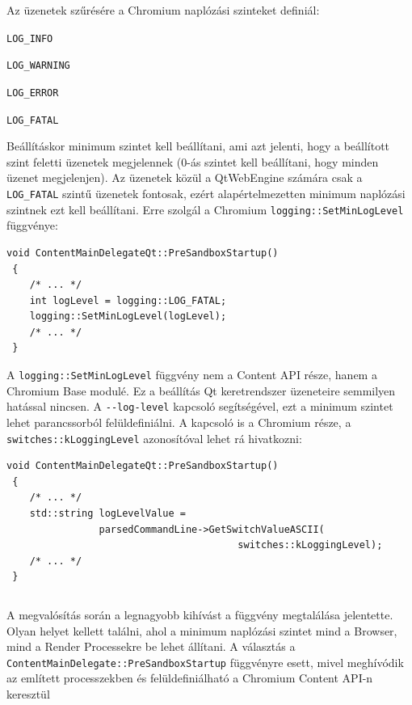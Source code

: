 \documentclass[12pt]{report}
\begin{document}
Az üzenetek szűrésére a Chromium naplózási szinteket definiál:
\begin{description}[
            labelsep=-0.5cm,
            itemsep=0cm,
            before={\renewcommand\makelabel[1]{\bfseries ##1}}]
    \item[0] \texttt{LOG\_INFO}
    \item[1] \texttt{LOG\_WARNING}
    \item[2] \texttt{LOG\_ERROR}
    \item[3] \texttt{LOG\_FATAL}
\end{description}
Beállításkor minimum szintet kell beállítani, ami azt jelenti, hogy a beállított szint
feletti üzenetek megjelennek (0-ás szintet kell beállítani, hogy minden üzenet megjelenjen).
Az üzenetek közül a QtWebEngine számára csak a \texttt{LOG\_FATAL} szintű üzenetek fontosak,
ezért alapértelmezetten minimum naplózási szintnek ezt kell beállítani.
Erre szolgál a Chromium \texttt{logging::SetMinLogLevel} függvénye:
\begin{lstlisting}[title=src/core/content\_main\_delegate\_qt.cpp]
 void ContentMainDelegateQt::PreSandboxStartup()
 {
    /* ... */
    int logLevel = logging::LOG_FATAL;
    logging::SetMinLogLevel(logLevel);
    /* ... */
 }
\end{lstlisting}
A \texttt{logging::SetMinLogLevel} függvény nem a Content API része, hanem a Chromium Base
modulé. Ez a beállítás Qt keretrendszer üzeneteire semmilyen hatással nincsen.
A \texttt{-{}-log-level} kapcsoló segítségével, ezt a minimum szintet lehet parancssorból
felüldefiniálni. A kapcsoló is a Chromium része, a \texttt{switches::kLoggingLevel}
azonosítóval lehet rá hivatkozni:
\begin{lstlisting}[title=src/core/content\_main\_delegate\_qt.cpp]
 void ContentMainDelegateQt::PreSandboxStartup()
 {
    /* ... */
    std::string logLevelValue =
                parsedCommandLine->GetSwitchValueASCII(
                                        switches::kLoggingLevel);
    /* ... */
 }
\end{lstlisting}
\begin{verbatim}
\end{verbatim}

A megvalósítás során a legnagyobb kihívást a függvény megtalálása jelentette. Olyan helyet
kellett találni, ahol a minimum naplózási szintet mind a Browser, mind a Render Processekre
be lehet állítani. A választás a \texttt{ContentMainDelegate::PreSandboxStartup} függvényre
esett, mivel meghívódik az említett processzekben és felüldefiniálható a Chromium Content
API-n keresztül
\end{document}

